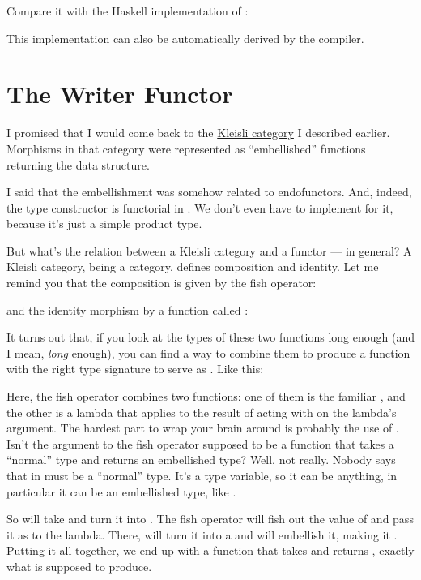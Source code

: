 Compare it with the Haskell implementation of :

This implementation can also be automatically derived by the compiler.

\section{The Writer Functor}

I promised that I would come back to the \hyperref[kleisli-categories]{Kleisli
category} I described earlier. Morphisms in that category were
represented as ``embellished'' functions returning the 
data structure.

I said that the embellishment was somehow related to endofunctors. And,
indeed, the  type constructor is functorial in
. We don't even have to implement  for it,
because it's just a simple product type.

But what's the relation between a Kleisli category and a functor --- in
general? A Kleisli category, being a category, defines composition and
identity. Let me remind you that the composition is given by the fish
operator:

and the identity morphism by a function called :

It turns out that, if you look at the types of these two functions long
enough (and I mean, \emph{long} enough), you can find a way to combine
them to produce a function with the right type signature to serve as
. Like this:

Here, the fish operator combines two functions: one of them is the
familiar , and the other is a lambda that applies
 to the result of acting with  on the lambda's
argument. The hardest part to wrap your brain around is probably the use
of . Isn't the argument to the fish operator supposed to be a
function that takes a ``normal'' type and returns an embellished type?
Well, not really. Nobody says that  in
 must be a ``normal'' type. It's a
type variable, so it can be anything, in particular it can be an
embellished type, like .

So  will take  and turn it into
. The fish operator will fish out the value of
 and pass it as  to the lambda. There, 
will turn it into a  and  will embellish it,
making it . Putting it all together, we end up with a
function that takes  and returns ,
exactly what  is supposed to produce.

